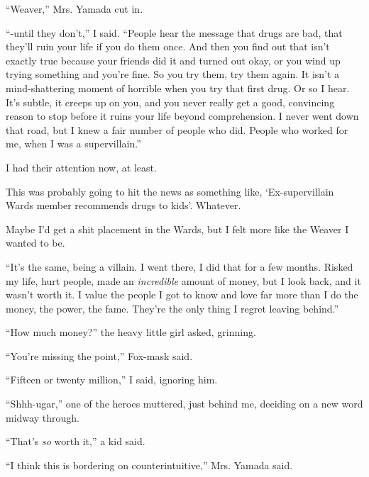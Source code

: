 ``Weaver,'' Mrs. Yamada cut in.



``-until they don't,'' I said.  ``People hear the message that drugs are bad, that they'll ruin your life if you do them once.  And then you find out that isn't exactly true because your friends did it and turned out okay, or you wind up trying something and you're fine.  So you try them, try them again.  It isn't a mind-shattering moment of horrible when you try that first drug.  Or so I hear.  It's subtle, it creeps up on you, and you never really get a good, convincing reason to stop before it ruins your life beyond comprehension.  I never went down that road, but I knew a fair number of people who did.  People who worked for me, when I was a supervillain.''



I had their attention now, at least.



This was probably going to hit the news as something like, `Ex-supervillain Wards member recommends drugs to kids'.  Whatever.



Maybe I'd get a shit placement in the Wards, but I felt more like the Weaver I wanted to be.



``It's the same, being a villain.  I went there, I did that for a few months.  Risked my life, hurt people, made an \emph{incredible} amount of money, but I look back, and it wasn't worth it.  I value the people I got to know and love far more than I do the money, the power, the fame.  They're the only thing I regret leaving behind.''



``How much money?'' the heavy little girl asked, grinning.



``You're missing the point,'' Fox-mask said.



``Fifteen or twenty million,'' I said, ignoring him.



``Shhh-ugar,'' one of the heroes muttered, just behind me, deciding on a new word midway through.



``That's \emph{so} worth it,'' a kid said.



``I think this is bordering on counterintuitive,'' Mrs. Yamada said.



